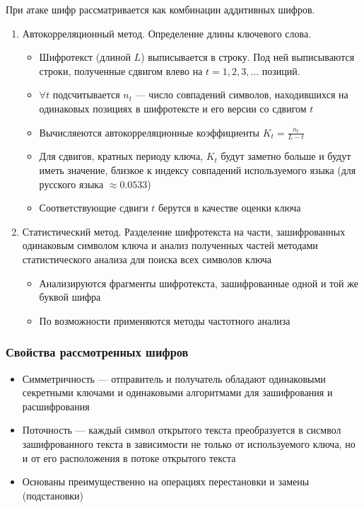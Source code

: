 \documentclass[a4paper, 14pt]{extarticle}
\begin{document}
При атаке шифр рассматривается как комбинации аддитивных шифров. 
\begin{enumerate}
    \item Автокорреляционный метод. Определение длины ключевого слова. 
    \begin{itemize}
        \item Шифротекст (длиной $L$) выписывается в строку. Под ней выписываются строки, полученные сдвигом влево на $t=1,2,3,\ldots$ позиций.
        \item $ \forall t $ подсчитывается $n_t$ --- число совпадений символов, находившихся на одинаковых позициях в шифротексте и его версии со сдвигом $t$
        \item Вычисляеются автокорреляционные коэффициенты $ K_t = \frac{n_t}{L-t} $
        \item Для сдвигов, кратных периоду ключа, $K_t$ будут заметно больше и будут иметь значение, близкое к индексу совпадений используемого языка (для русского языка $\approx 0.0533$)
        \item Соответствующие сдвиги $t$ берутся в качестве оценки ключа
    \end{itemize}
    \item Статистический метод. Разделение шифротекста на части, зашифрованных одинаковым символом ключа и анализ полученных частей методами статистического анализа для поиска всех символов ключа
    \begin{itemize}
        \item Анализируются фрагменты шифротекста, зашифрованные одной и той же буквой шифра
        \item По возможности применяются методы частотного анализа
    \end{itemize}
\end{enumerate}

\subsubsection{Свойства рассмотренных шифров}
\begin{itemize}
    \item Симметричность --- отправитель и получатель обладают одинаковыми секретными ключами и одинаковыми алгоритмами для зашифрования и расшифрования
    \item Поточность --- каждый символ открытого текста преобразуется в сисмвол зашифрованного текста в зависимости не только от используемого ключа, но и от его расположения в потоке открытого текста
    \item Основаны преимущественно на операциях перестановки и замены (подстановки)
\end{itemize}
\end{document}
